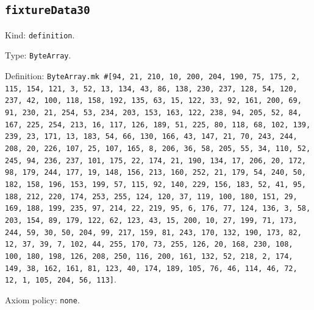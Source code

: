\documentclass[11pt]{article}
\begin{document}
\subsection*{\texttt{fixtureData30}}
\noindent Kind: \texttt{definition}.\par
\noindent Type: \texttt{ByteArray}.\par
\noindent Definition: \texttt{ByteArray.mk \#[94, 21, 210, 10, 200, 204, 190, 75, 175, 2, 115, 154, 121, 3, 52, 13, 134, 43, 86, 138, 230, 237, 128, 54, 120, 237, 42, 100, 118, 158, 192, 135, 63, 15, 122, 33, 92, 161, 200, 69, 91, 230, 21, 254, 53, 234, 203, 153, 163, 122, 238, 94, 205, 52, 84, 167, 225, 254, 213, 16, 117, 126, 189, 51, 225, 80, 118, 68, 102, 139, 239, 23, 171, 13, 183, 54, 66, 130, 166, 43, 147, 21, 70, 243, 244, 208, 20, 226, 107, 25, 107, 165, 8, 206, 36, 58, 205, 55, 34, 110, 52, 245, 94, 236, 237, 101, 175, 22, 174, 21, 190, 134, 17, 206, 20, 172, 98, 179, 244, 177, 19, 148, 156, 213, 160, 252, 21, 179, 54, 240, 50, 182, 158, 196, 153, 199, 57, 115, 92, 140, 229, 156, 183, 52, 41, 95, 188, 212, 220, 174, 253, 255, 124, 120, 37, 119, 100, 180, 151, 29, 169, 188, 199, 235, 97, 214, 22, 219, 95, 6, 176, 77, 124, 136, 3, 58, 203, 154, 89, 179, 122, 62, 123, 43, 15, 200, 10, 27, 199, 71, 173, 244, 59, 30, 50, 204, 99, 217, 159, 81, 243, 170, 132, 190, 173, 82, 12, 37, 39, 7, 102, 44, 255, 170, 73, 255, 126, 20, 168, 230, 108, 100, 180, 198, 126, 208, 250, 116, 200, 161, 132, 52, 218, 2, 174, 149, 38, 162, 161, 81, 123, 40, 174, 189, 105, 76, 46, 114, 46, 72, 12, 1, 105, 204, 56, 113]}.\par
\noindent Axiom policy: \texttt{none}.\par
\end{document}
